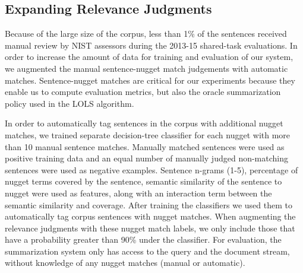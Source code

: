  \subsection{Expanding Relevance Judgments}
 \label{sec:reljudge}

 Because of the large size of the corpus,
 less than 1\% of the sentences received
 manual review by NIST assessors during the 2013-15 shared-task evaluations.  
  In order to increase the amount of data for training and
 evaluation of our system, we augmented the manual sentence-nugget match
judgements with automatic matches.
 Sentence-nugget matches are critical for our experiments because they
 enable us to compute evaluation metrics, but also the oracle summarization
 policy used in the LOLS algorithm.

 In order to automatically tag sentences in the corpus with additional
 nugget matches,
 we trained separate decision-tree classifier for
 each nugget with more than 10 manual sentence matches.  Manually matched
 sentences were used as positive training data and an equal number of
 manually judged non-matching sentences were used as negative examples.
 Sentence n-grams (1-5), percentage of nugget terms covered by the sentence,
 semantic similarity of the sentence to nugget were used as features, along
 with an interaction term between the semantic similarity and coverage. 
 After training the classifiers we used them to automatically tag 
 corpus sentences with nugget matches.
 When
 augmenting the relevance judgments with these nugget match labels, we
 only include those that have a probability greater than 90\% under the
 classifier. %
 For evaluation, the summarization system only has access to the query and
 the document stream, without knowledge of any nugget matches (manual or
 automatic).


